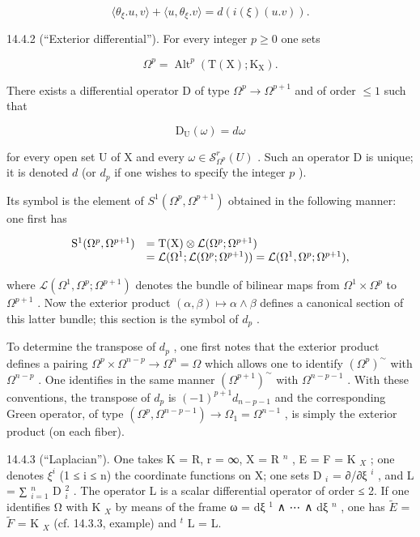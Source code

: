 \[
\langle \theta_ {\xi}. u, v \rangle + \langle u, \theta_ {\xi}. v \rangle = d (i (\xi) (u. v)).
\]

14.4.2 (“Exterior differential”). For every integer \(p \geqslant 0\) one sets

\[
\Omega^ {p} = \operatorname{Alt} ^ {p} (\mathrm{T} (\mathrm{X}); \mathrm{K} _ {\mathrm{X}}).
\]

There exists a differential operator D of type \(\Omega^{p} \to \Omega^{p+1}\) and of order \(\leqslant 1\) such that

\[
\mathrm{D} _ {\mathrm{U}} (\omega) = d \omega
\]

for every open set U of X and every \(\omega\in\mathcal{S}_{\Omega^{p}}^{r}(U)\) . Such an operator D is unique; it is denoted \(d\) (or \(d_{p}\) if one wishes to specify the integer \(p\) ).

Its symbol is the element of \(S^1(\Omega^p, \Omega^{p+1})\) obtained in the following manner: one first has

\[
\begin{array}{r l} \mathrm{S} ^ {1} (\Omega^ {p}, \Omega^ {p + 1}) & = \mathrm{T} (\mathrm{X}) \otimes \mathcal {L} (\Omega^ {p}; \Omega^ {p + 1}) \\ & = \mathcal {L} (\Omega^ {1}; \mathcal {L} (\Omega^ {p}; \Omega^ {p + 1})) = \mathcal {L} (\Omega^ {1}, \Omega^ {p}; \Omega^ {p + 1}), \end{array}
\]

where \(\mathcal{L}(\Omega^{1},\Omega^{p};\Omega^{p+1})\) denotes the bundle of bilinear maps from \(\Omega^{1}\times\Omega^{p}\) to \(\Omega^{p+1}\) . Now the exterior product \((\alpha,\beta)\mapsto\alpha\wedge\beta\) defines a canonical section of this latter bundle; this section is the symbol of \(d_{p}\) .

To determine the transpose of \(d_{p}\) , one first notes that the exterior product defines a pairing \(\Omega^{p} \times \Omega^{n-p} \to \Omega^{n} = \Omega\) which allows one to identify \((\Omega^{p})^{\sim}\) with \(\Omega^{n-p}\) . One identifies in the same manner \((\Omega^{p+1})^{\sim}\) with \(\Omega^{n-p-1}\) . With these conventions, the transpose of \(d_{p}\) is \((-1)^{p+1}d_{n-p-1}\) and the corresponding Green operator, of type \((\Omega^{p}, \Omega^{n-p-1}) \to \Omega_{1} = \Omega^{n-1}\) , is simply the exterior product (on each fiber).

14.4.3 (“Laplacian”). One takes K = R, r = ∞, X = R \(^{n}\) , E = F = K \(_{X}\) ; one denotes \(\xi^{i}\) (1 ≤ i ≤ n) the coordinate functions on X; one sets D \(_{i}\) = ∂/∂ξ \(^{i}\) , and L = ∑ \(_{i=1}^{n}\) D \(_{i}^{2}\) . The operator L is a scalar differential operator of order ≤ 2. If one identifies Ω with K \(_{X}\) by means of the frame ω = dξ \(^{1}\) ∧ ⋯ ∧ dξ \(^{n}\) , one has \(\tilde{E}\) = \(\tilde{F}\) = K \(_{X}\) (cf. 14.3.3, example) and \(^{t}\) L = L.

